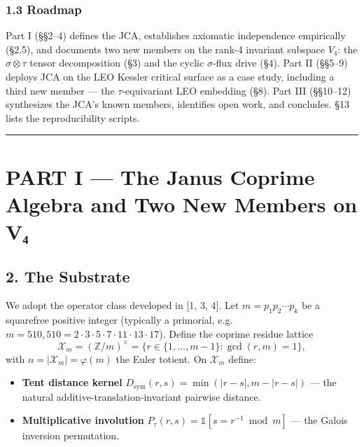 \documentclass[
]{article}
\providecommand{\tightlist}{%
  \setlength{\itemsep}{0pt}\setlength{\parskip}{0pt}}
\begin{document}
\subsubsection{1.3 Roadmap}\label{roadmap}

Part I (§§2--4) defines the JCA, establishes axiomatic independence
empirically (§2.5), and documents two new members on the rank-4
invariant subspace \(V_4\): the \(\sigma\otimes\tau\) tensor
decomposition (§3) and the cyclic \(\sigma\)-flux drive (§4). Part II
(§§5--9) deploys JCA on the LEO Kessler critical surface as a case
study, including a third new member --- the \(\tau\)-equivariant LEO
embedding (§8). Part III (§§10--12) synthesizes the JCA's known members,
identifies open work, and concludes. §13 lists the reproducibility
scripts.

\begin{center}\rule{0.5\linewidth}{0.5pt}\end{center}

\section{PART I --- The Janus Coprime Algebra and Two New Members on
V₄}\label{part-i-the-janus-coprime-algebra-and-two-new-members-on-vux2084}

\subsection{2. The Substrate}\label{the-substrate}

We adopt the operator class developed in {[}1, 3, 4{]}. Let
\(m = p_1 p_2 \cdots p_k\) be a squarefree positive integer (typically a
primorial,
e.g.~\(m = 510{,}510 = 2 \cdot 3 \cdot 5 \cdot 7 \cdot 11 \cdot 13 \cdot 17\)).
Define the coprime residue lattice
\[\mathcal{X}_m = (\mathbb{Z}/m)^\times = \{r \in \{1, \ldots, m-1\} : \gcd(r, m) = 1\},\]
with \(n = |\mathcal{X}_m| = \varphi(m)\) the Euler totient. On
\(\mathcal{X}_m\) define:

\begin{itemize}
\tightlist
\item
  \textbf{Tent distance kernel}
  \(D_\text{sym}(r, s) = \min(|r-s|, m-|r-s|)\) --- the natural
  additive-translation-invariant pairwise distance.
\item
  \textbf{Multiplicative involution}
  \(P_\tau(r, s) = \mathbb{1}[s = r^{-1} \bmod m]\) --- the Galois
  inversion permutation.
\end{itemize}
\end{document}
